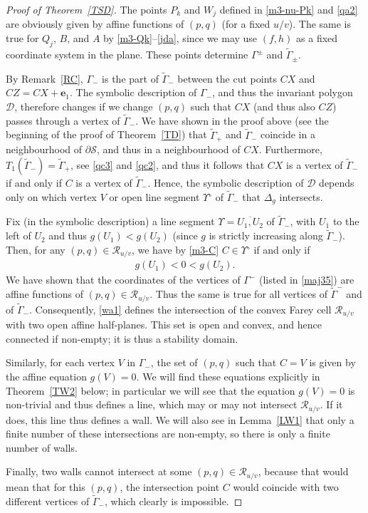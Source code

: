 \documentclass[11pt,reqno,tbtags,a4paper]{amsart}
\numberwithin{equation}{section}
\theoremstyle{plain}%
\theoremstyle{definition}
\theoremstyle{remark}
\newcommand{\refT}[1]{Theorem~\ref{#1}}
\newcommand{\refL}[1]{Lemma~\ref{#1}}
\newcommand{\refR}[1]{Remark~\ref{#1}}
\newcommand\inter{\ensuremath{^\circ}}
\newcommand\gD{\Delta}
\newcommand\gG{\Gamma}
\newcommand\gU{\Upsilon}
\newcommand\cD{\mathcal D}
\newcommand\cR{{\mathcal R}}
\newcommand\cS{{\mathcal S}}
\newcommand\ve{\mathbf{e}}
\newcommand\tgG{\widetilde{\gG}}
\newcommand\linje[1]{\overline{#1}}
\newcommand\0{{\boldsymbol 0}}
\newcommand\1{{\boldsymbol 1}}
\begin{document}
\begin{proof}[Proof of \refT{TSD}]
The points $P_k$ and $W_j$ defined in \eqref{m3-nu-Pk} and \eqref{qa2}
are obviously given by affine functions of $(p,q)$ (for a fixed $u/v$).
The same is true for $Q_j$, $B$, and $A$ by \eqref{m3-Qk}--\eqref{jda},
since we may use $(f,h)$ as a fixed coordinate system in the plane.
These points determine $\gG^\pm$ and $\tgG_\pm$.

By \refR{RC}, $\gG_-$ is the part of $\tgG_-$ between
the cut points $CX$ and $CZ=CX+\ve_1$. 
The symbolic description of $\gG_-$, and thus
the invariant polygon $\cD$, therefore changes if we change $(p,q)$ such that
$CX$ (and thus also $CZ$) passes through a vertex of $\tgG_-$.
We have shown in the proof above 
(see the beginning of the proof of \refT{TD})
that $\tgG_+$ and $\tgG_-$ coincide in a neighbourhood of $\partial\cS$, and thus
in a neighbourhood of $CX$. 
Furthermore, $T_1(\tgG_-)=\tgG_+$, see \eqref{qc3} and \eqref{qc2},
and thus it follows that $CX$ is a vertex of $\tgG_-$ if and only if $C$ is a
vertex of $\tgG_-$.
Hence, the symbolic description of $\cD$ depends only on 
which vertex $V$ or open line segment $\gU\inter$ of $\tgG_-$ that $\gD_g$
intersects. 

Fix (in the symbolic description) a  line segment 
$\gU=\linje{U_1,U_2}$ of $\tgG_-$, with $U_1$ to the left of $U_2$
and thus $g(U_1)<g(U_2)$ (since $g$ is strictly increasing along $\tgG_-$).
Then, for any
$(p,q)\in\cR_{u/v}$, 
we have by \eqref{m3-C} $C\in\gU\inter$ if and only if 
\begin{align}\label{wa1}
  g(U_1)<0<g(U_2).
\end{align}
We have shown that the coordinates of the vertices of $\gG^-$ 
(listed in \eqref{maj35})  
are affine functions of $(p,q)\in\cR_{u/v}$.
Thus the same is true for all vertices of $\tgG^-$ and of $\tgG_-$.
Consequently, \eqref{wa1} defines the intersection of the convex Farey cell
$\cR_{u/v}$ with two open affine half-planes. This set is open and convex,
and hence connected if non-empty; it is thus a stability domain.

Similarly, for each vertex $V$ in $\gG_-$, the set of $(p,q)$ such that $C=V$
is given by the affine equation $g(V)=0$. 
We will find these equations explicitly 
in \refT{TW2} below; in particular we will see that the equation
$g(V)=0$
is non-trivial and thus defines a line, which may or may not
intersect $\cR_{u/v}$. If it does, this line thus defines a wall.
We will also see in \refL{LW1}
that only a finite number of these intersections are non-empty, so there is
only a finite number of walls.

Finally, two walls cannot intersect at some $(p,q)\in\cR_{u/v}$,
because that would mean that for this $(p,q)$, the intersection point $C$
would coincide with two different vertices of $\tgG_-$, which clearly is
impossible.
\end{proof}
\end{document}
